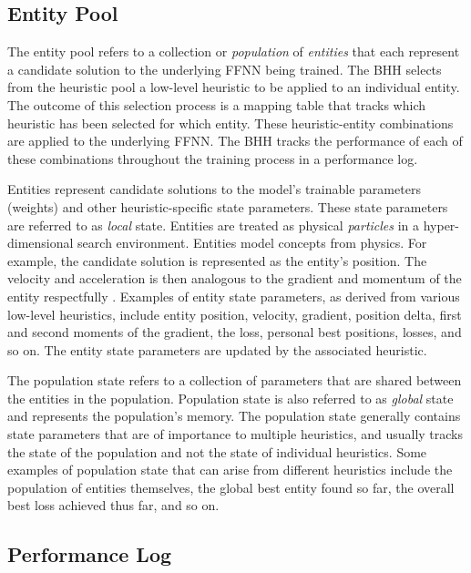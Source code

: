 \documentclass[preprint,review,12pt]{elsarticle}
\begin{document}
\subsection{Entity Pool}\label{sec:bhh:entity_pool}

The entity pool refers to a collection or \textit{population} of \textit{entities} that each represent a candidate solution to the underlying \acs{FFNN} being trained. The \acs{BHH} selects from the heuristic pool a low-level heuristic to be applied to an individual entity. The outcome of this selection process is a mapping table that tracks which heuristic has been selected for which entity. These heuristic-entity combinations are applied to the underlying \acs{FFNN}. The \acs{BHH} tracks the performance of each of these combinations throughout the training process in a performance log.

Entities represent candidate solutions to the model's trainable parameters (weights) and other heuristic-specific state parameters. These state parameters are referred to as \textit{local} state. Entities are treated as physical \textit{particles} in a hyper-dimensional search environment. Entities model concepts from physics. For example, the candidate solution is represented as the entity's position. The velocity and acceleration is then analogous to the gradient and momentum of the entity respectfully \cite{ref:eberhart:1995}. Examples of entity state parameters, as derived from various low-level heuristics, include entity position, velocity, gradient, position delta, first and second moments of the gradient, the loss, personal best positions, losses, and so on. The entity state parameters are updated by the associated heuristic.

The population state refers to a collection of parameters that are shared between the entities in the population. Population state is also referred to as \textit{global} state and represents the population's memory. The population state generally contains state parameters that are of importance to multiple heuristics, and usually tracks the state of the population and not the state of individual heuristics. Some examples of population state that can arise from different heuristics include the population of entities themselves, the global best entity found so far, the overall best loss achieved thus far, and so on.

\subsection{Performance Log}\label{sec:bhh:performance_log}
\end{document}
